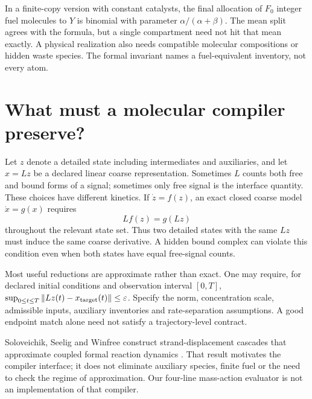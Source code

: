 In a finite-copy version with constant catalysts, the final allocation of
$F_0$ integer fuel molecules to $Y$ is binomial with parameter
$\alpha/(\alpha+\beta)$. The mean split agrees with the formula, but a single
compartment need not hit that mean exactly. A physical realization also
needs compatible molecular compositions or hidden waste species. The
formal invariant names a fuel-equivalent inventory, not every atom.

\section{What must a molecular compiler preserve?}

Let $z$ denote a detailed state including intermediates and auxiliaries,
and let $x=Lz$ be a declared linear coarse representation. Sometimes $L$
counts both free and bound forms of a signal; sometimes only free signal
is the interface quantity. These choices have different kinetics.
If $\dot z=f(z)$, an exact closed coarse model $\dot x=g(x)$ requires
\begin{equation}
 Lf(z)=g(Lz)
 \label{eq:closure}
\end{equation}
throughout the relevant state set. Thus two detailed states with the same
$Lz$ must induce the same coarse derivative. A hidden bound complex can
violate this condition even when both states have equal free-signal counts.


Most useful reductions are approximate rather than exact. One may require,
for declared initial conditions and observation interval $[0,T]$,
$\sup_{0\leq t\leq T}\|Lz(t)-x_{\rm target}(t)\|\leq\varepsilon$.
Specify the norm, concentration scale, admissible inputs, auxiliary inventories
and rate-separation assumptions. A good endpoint match alone need not satisfy
a trajectory-level contract.

Soloveichik, Seelig and Winfree construct strand-displacement cascades that
approximate coupled formal reaction dynamics \cite{Soloveichik2010}. That result
motivates the compiler interface; it does not eliminate auxiliary species,
finite fuel or the need to check the regime of approximation.
Our four-line mass-action evaluator is not an implementation of that compiler.

